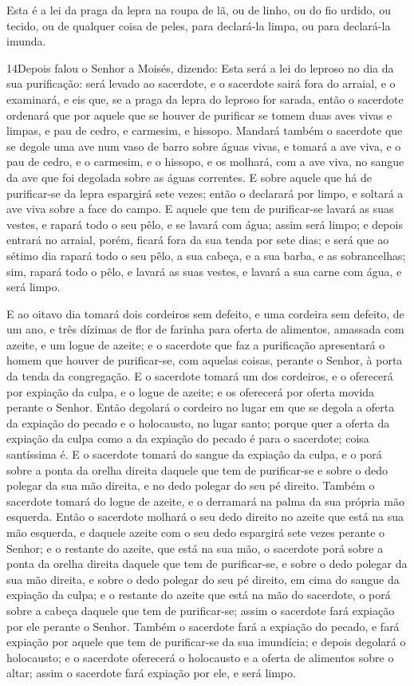 Esta é a lei da praga da lepra na roupa de lã, ou de linho, ou do
fio urdido, ou tecido, ou de qualquer coisa de peles, para
declará-la limpa, ou para declará-la imunda.

\medskip

\lettrine{14} Depois falou o Senhor a Moisés, dizendo:
Esta será a lei do leproso no dia da sua purificação: será
levado ao sacerdote, e o sacerdote sairá fora do arraial, e o
examinará, e eis que, se a praga da lepra do leproso for sarada,
então o sacerdote ordenará que por aquele que se houver de
purificar se tomem duas aves vivas e limpas, e pau de cedro, e
carmesim, e hissopo. Mandará também o sacerdote que se degole
uma ave num vaso de barro sobre águas vivas, e tomará a ave
viva, e o pau de cedro, e o carmesim, e o hissopo, e os molhará, com
a ave viva, no sangue da ave que foi degolada sobre as águas
correntes. E sobre aquele que há de purificar-se da lepra
espargirá sete vezes; então o declarará por limpo, e soltará a ave
viva sobre a face do campo. E aquele que tem de purificar-se
lavará as suas vestes, e rapará todo o seu pêlo, e se lavará com
água; assim será limpo; e depois entrará no arraial, porém, ficará
fora da sua tenda por sete dias; e será que ao sétimo dia rapará
todo o seu pêlo, a sua cabeça, e a sua barba, e as sobrancelhas;
sim, rapará todo o pêlo, e lavará as suas vestes, e lavará a sua
carne com água, e será limpo.

E ao oitavo dia tomará dois cordeiros sem defeito, e uma cordeira
sem defeito, de um ano, e três dízimas de flor de farinha para
oferta de alimentos, amassada com azeite, e um logue de azeite;
e o sacerdote que faz a purificação apresentará o homem que
houver de purificar-se, com aquelas coisas, perante o Senhor, à
porta da tenda da congregação. E o sacerdote tomará um dos
cordeiros, e o oferecerá por expiação da culpa, e o logue de azeite;
e os oferecerá por oferta movida perante o Senhor. Então
degolará o cordeiro no lugar em que se degola a oferta da expiação
do pecado e o holocausto, no lugar santo; porque quer a oferta da
expiação da culpa como a da expiação do pecado é para o sacerdote;
coisa santíssima é. E o sacerdote tomará do sangue da
expiação da culpa, e o porá sobre a ponta da orelha direita daquele
que tem de purificar-se e sobre o dedo polegar da sua mão direita, e
no dedo polegar do seu pé direito. Também o sacerdote tomará
do logue de azeite, e o derramará na palma da sua própria mão
esquerda. Então o sacerdote molhará o seu dedo direito no
azeite que está na sua mão esquerda, e daquele azeite com o seu dedo
espargirá sete vezes perante o Senhor; e o restante do
azeite, que está na sua mão, o sacerdote porá sobre a ponta da
orelha direita daquele que tem de purificar-se, e sobre o dedo
polegar da sua mão direita, e sobre o dedo polegar do seu pé
direito, em cima do sangue da expiação da culpa; e o restante
do azeite que está na mão do sacerdote, o porá sobre a cabeça
daquele que tem de purificar-se; assim o sacerdote fará expiação por
ele perante o Senhor. Também o sacerdote fará a expiação do
pecado, e fará expiação por aquele que tem de purificar-se da sua
imundícia; e depois degolará o holocausto; e o sacerdote
oferecerá o holocausto e a oferta de alimentos sobre o altar; assim
o sacerdote fará expiação por ele, e será limpo.

